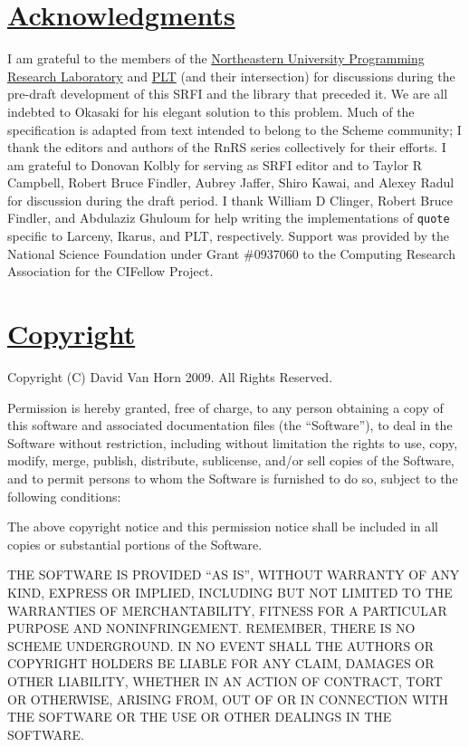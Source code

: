 \section{\texorpdfstring{\href{}{Acknowledgments}}{Acknowledgments}}\label{acknowledgments}

I am grateful to the members of the
\href{http://www.ccs.neu.edu/research/prl/}{Northeastern University
Programming Research Laboratory} and \href{http://plt-scheme.org/}{PLT}
(and their intersection) for discussions during the pre-draft
development of this SRFI and the library that preceded it. We are all
indebted to Okasaki for his elegant solution to this problem. Much of
the specification is adapted from text intended to belong to the Scheme
community; I thank the editors and authors of the RnRS series
collectively for their efforts. I am grateful to Donovan Kolbly for
serving as SRFI editor and to Taylor R Campbell, Robert Bruce Findler,
Aubrey Jaffer, Shiro Kawai, and Alexey Radul for discussion during the
draft period. I thank William D Clinger, Robert Bruce Findler, and
Abdulaziz Ghuloum for help writing the implementations of \texttt{quote}
specific to Larceny, Ikarus, and PLT, respectively. Support was provided
by the National Science Foundation under Grant \#0937060 to the
Computing Research Association for the CIFellow Project.

\section{\texorpdfstring{\href{}{Copyright}}{Copyright}}\label{copyright}

Copyright (C) David Van Horn 2009. All Rights Reserved.

Permission is hereby granted, free of charge, to any person obtaining a
copy of this software and associated documentation files (the
``Software''), to deal in the Software without restriction, including
without limitation the rights to use, copy, modify, merge, publish,
distribute, sublicense, and/or sell copies of the Software, and to
permit persons to whom the Software is furnished to do so, subject to
the following conditions:

The above copyright notice and this permission notice shall be included
in all copies or substantial portions of the Software.

THE SOFTWARE IS PROVIDED ``AS IS'', WITHOUT WARRANTY OF ANY KIND,
EXPRESS OR IMPLIED, INCLUDING BUT NOT LIMITED TO THE WARRANTIES OF
MERCHANTABILITY, FITNESS FOR A PARTICULAR PURPOSE AND NONINFRINGEMENT.
REMEMBER, THERE IS NO SCHEME UNDERGROUND. IN NO EVENT SHALL THE AUTHORS
OR COPYRIGHT HOLDERS BE LIABLE FOR ANY CLAIM, DAMAGES OR OTHER
LIABILITY, WHETHER IN AN ACTION OF CONTRACT, TORT OR OTHERWISE, ARISING
FROM, OUT OF OR IN CONNECTION WITH THE SOFTWARE OR THE USE OR OTHER
DEALINGS IN THE SOFTWARE.

